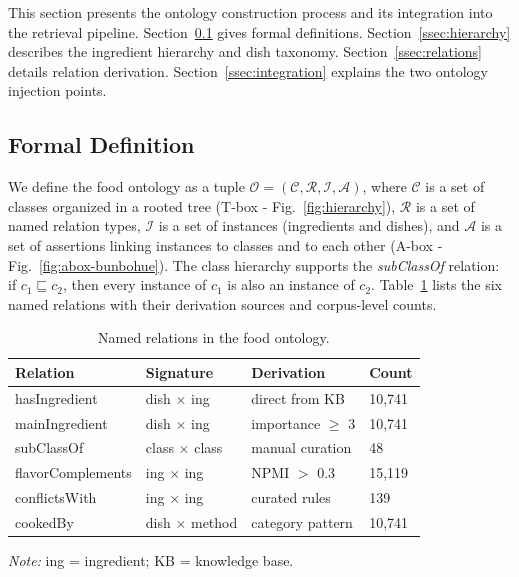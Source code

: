 \label{sec:framework}

This section presents the ontology construction process and its integration into the retrieval pipeline. Section~\ref{ssec:formal} gives formal definitions. Section~\ref{ssec:hierarchy} describes the ingredient hierarchy and dish taxonomy. Section~\ref{ssec:relations} details relation derivation. Section~\ref{ssec:integration} explains the two ontology injection points.

\subsection{Formal Definition}
\label{ssec:formal}

We define the food ontology as a tuple $\mathcal{O} = (\mathcal{C}, \mathcal{R}, \mathcal{I}, \mathcal{A})$, where $\mathcal{C}$ is a set of classes organized in a rooted tree (T-box - Fig.~\ref{fig:hierarchy}), $\mathcal{R}$ is a set of named relation types, $\mathcal{I}$ is a set of instances (ingredients and dishes), and $\mathcal{A}$ is a set of assertions linking instances to classes and to each other (A-box - Fig.~\ref{fig:abox-bunbohue}). The class hierarchy supports the \emph{subClassOf} relation: if $c_1 \sqsubseteq c_2$, then every instance of $c_1$ is also an instance of $c_2$. Table~\ref{tab:relations} lists the six named relations with their derivation sources and corpus-level counts.

\begin{table}[t]
\centering
\caption{Named relations in the food ontology.}
\label{tab:relations}
\small
\begin{tabular}{llll}
\toprule
\textbf{Relation} & \textbf{Signature} & \textbf{Derivation} & \textbf{Count} \\
\midrule
hasIngredient      & dish $\times$ ing            & direct from KB     & 10{,}741 \\
mainIngredient     & dish $\times$ ing            & importance $\geq$ 3 & 10{,}741 \\
subClassOf         & class $\times$ class         & manual curation    & 48 \\
flavorComplements  & ing $\times$ ing             & NPMI $>$ 0.3      & 15{,}119 \\
conflictsWith      & ing $\times$ ing             & curated rules      & 139 \\
cookedBy           & dish $\times$ method         & category pattern   & 10{,}741 \\
\bottomrule
\end{tabular}
\vspace{2pt}
  \par\noindent\footnotesize\textit{Note:} ing = ingredient; KB = knowledge base.
\end{table}

